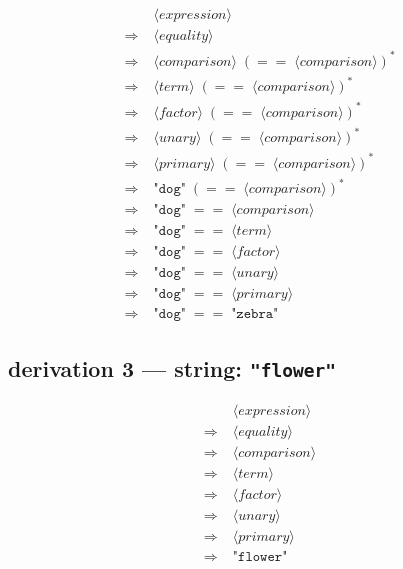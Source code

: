 \documentclass[12pt]{article}
\begin{document}
\begin{align*}
&\langle\textit{expression}\rangle \\
\Rightarrow\;&\langle\textit{equality}\rangle \\
\Rightarrow\;&\langle\textit{comparison}\rangle\;(==\;\langle\textit{comparison}\rangle)^* \\
\Rightarrow\;&\langle\textit{term}\rangle\;(==\;\langle\textit{comparison}\rangle)^* \\
\Rightarrow\;&\langle\textit{factor}\rangle\;(==\;\langle\textit{comparison}\rangle)^* \\
\Rightarrow\;&\langle\textit{unary}\rangle\;(==\;\langle\textit{comparison}\rangle)^* \\
\Rightarrow\;&\langle\textit{primary}\rangle\;(==\;\langle\textit{comparison}\rangle)^* \\
\Rightarrow\;&\texttt{"dog"}\;(==\;\langle\textit{comparison}\rangle)^* \\
\Rightarrow\;&\texttt{"dog"}\;==\;\langle\textit{comparison}\rangle \\
\Rightarrow\;&\texttt{"dog"}\;==\;\langle\textit{term}\rangle \\
\Rightarrow\;&\texttt{"dog"}\;==\;\langle\textit{factor}\rangle \\
\Rightarrow\;&\texttt{"dog"}\;==\;\langle\textit{unary}\rangle \\
\Rightarrow\;&\texttt{"dog"}\;==\;\langle\textit{primary}\rangle \\
\Rightarrow\;&\texttt{"dog"}\;==\;\texttt{"zebra"}
\end{align*}

\subsection*{derivation 3 --- string: \texttt{"flower"}}

\begin{align*}
&\langle\textit{expression}\rangle \\
\Rightarrow\;&\langle\textit{equality}\rangle \\
\Rightarrow\;&\langle\textit{comparison}\rangle \\
\Rightarrow\;&\langle\textit{term}\rangle \\
\Rightarrow\;&\langle\textit{factor}\rangle \\
\Rightarrow\;&\langle\textit{unary}\rangle \\
\Rightarrow\;&\langle\textit{primary}\rangle \\
\Rightarrow\;&\texttt{"flower"}
\end{align*}
\end{document}
